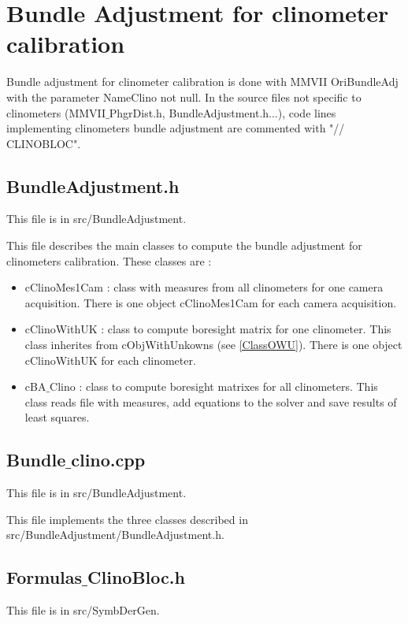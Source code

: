 \chapter{Bundle Adjustment for clinometer calibration}



Bundle adjustment for clinometer calibration is done with MMVII OriBundleAdj with the parameter NameClino not null. 
In the source files not specific to clinometers (MMVII$\_$PhgrDist.h, BundleAdjustment.h...), code lines implementing clinometers bundle adjustment are commented with "// CLINOBLOC".  

\section{BundleAdjustment.h}

This file is in src/BundleAdjustment.

This file describes the main classes to compute the bundle adjustment for clinometers calibration. These classes are :
\begin{itemize}
    \item cClinoMes1Cam : class with measures from all clinometers for one camera acquisition. There is one object cClinoMes1Cam for each camera acquisition.
    \item cClinoWithUK : class to compute boresight matrix for one clinometer. This class inherites from cObjWithUnkowns (see \ref{ClassOWU}). 
    There is one object cClinoWithUK for each clinometer.
    \item cBA$\_$Clino : class to compute boresight matrixes for all clinometers. This class reads file with measures, add equations to the solver and save results of least squares.
\end{itemize}

\section{Bundle$\_$clino.cpp}

This file is in src/BundleAdjustment.

This file implements the three classes described in src/BundleAdjustment/BundleAdjustment.h.


\section{Formulas$\_$ClinoBloc.h}

This file is in src/SymbDerGen.

